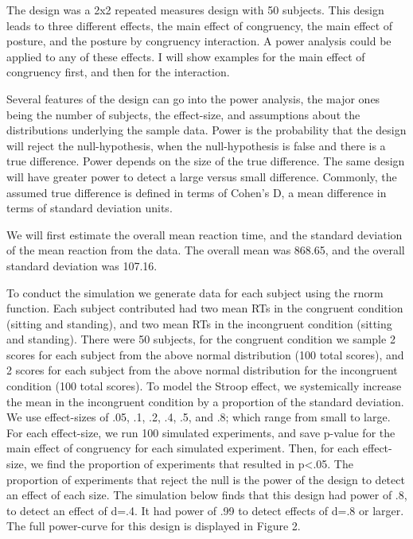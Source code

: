 \documentclass[
  english,
  man]{article}
\begin{document}
The design was a 2x2 repeated measures design with 50 subjects. This design leads to three different effects, the main effect of congruency, the main effect of posture, and the posture by congruency interaction. A power analysis could be applied to any of these effects. I will show examples for the main effect of congruency first, and then for the interaction.

Several features of the design can go into the power analysis, the major ones being the number of subjects, the effect-size, and assumptions about the distributions underlying the sample data. Power is the probability that the design will reject the null-hypothesis, when the null-hypothesis is false and there is a true difference. Power depends on the size of the true difference. The same design will have greater power to detect a large versus small difference. Commonly, the assumed true difference is defined in terms of Cohen's D, a mean difference in terms of standard deviation units.

We will first estimate the overall mean reaction time, and the standard deviation of the mean reaction from the data. The overall mean was 868.65, and the overall standard deviation was 107.16.

To conduct the simulation we generate data for each subject using the rnorm function. Each subject contributed had two mean RTs in the congruent condition (sitting and standing), and two mean RTs in the incongruent condition (sitting and standing). There were 50 subjects, for the congruent condition we sample 2 scores for each subject from the above normal distribution (100 total scores), and 2 scores for each subject from the above normal distribution for the incongruent condition (100 total scores). To model the Stroop effect, we systemically increase the mean in the incongruent condition by a proportion of the standard deviation. We use effect-sizes of .05, .1, .2, .4, .5, and .8; which range from small to large. For each effect-size, we run 100 simulated experiments, and save p-value for the main effect of congruency for each simulated experiment. Then, for each effect-size, we find the proportion of experiments that resulted in p\textless.05. The proportion of experiments that reject the null is the power of the design to detect an effect of each size. The simulation below finds that this design had power of .8, to detect an effect of d=.4. It had power of .99 to detect effects of d=.8 or larger. The full power-curve for this design is displayed in Figure 2.
\end{document}
